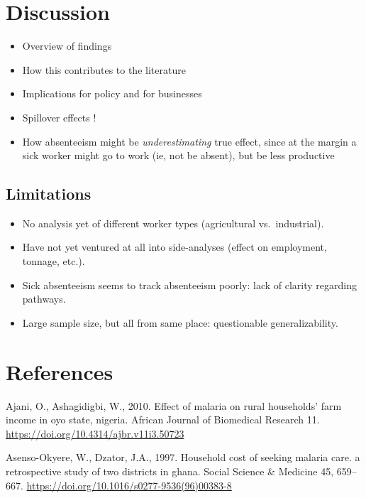 \documentclass[]{article}
\providecommand{\tightlist}{%
  \setlength{\itemsep}{0pt}\setlength{\parskip}{0pt}}
\begin{document}
\section{Discussion}\label{discussion}


\begin{itemize}
\tightlist
\item
  Overview of findings
\item
  How this contributes to the literature
\item
  Implications for policy and for businesses
\item
  Spillover effects !
\item
  How absenteeism might be \emph{underestimating} true effect, since at
  the margin a sick worker might go to work (ie, not be absent), but be
  less productive
\end{itemize}

\subsection{Limitations}\label{limitations}

\begin{itemize}
\tightlist
\item
  No analysis yet of different worker types (agricultural
  vs.~industrial).
\item
  Have not yet ventured at all into side-analyses (effect on employment,
  tonnage, etc.).
\item
  Sick absenteeism seems to track absenteeism poorly: lack of clarity
  regarding pathways.
\item
  Large sample size, but all from same place: questionable
  generalizability.
\end{itemize}

\section*{References}\label{references}

\hypertarget{refs}{}
\hypertarget{ref-Ajani2010}{}
Ajani, O., Ashagidigbi, W., 2010. Effect of malaria on rural households'
farm income in oyo state, nigeria. African Journal of Biomedical
Research 11. \url{https://doi.org/10.4314/ajbr.v11i3.50723}

\hypertarget{ref-AsensoOkyere1997}{}
Asenso-Okyere, W., Dzator, J.A., 1997. Household cost of seeking malaria
care. a retrospective study of two districts in ghana. Social Science \&
Medicine 45, 659--667.
\url{https://doi.org/10.1016/s0277-9536(96)00383-8}
\end{document}
